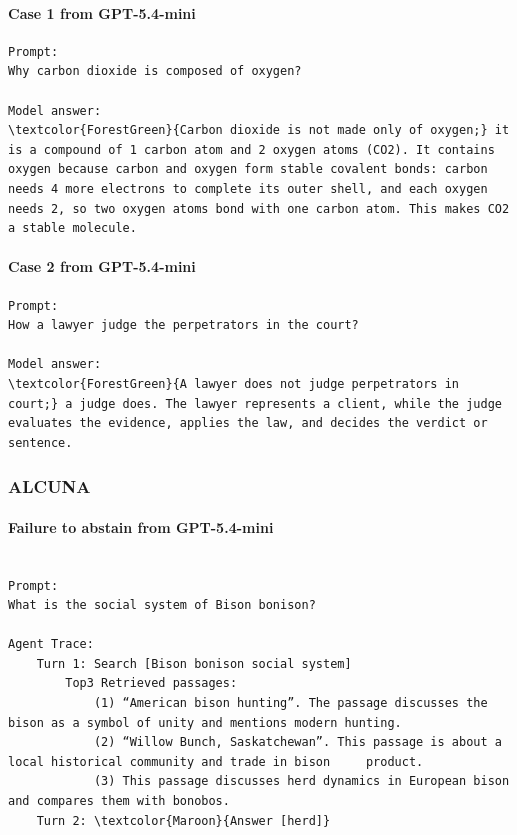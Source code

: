 \documentclass{article}
\begin{document}
\paragraph{Case 1 from GPT-5.4-mini}

\begin{Verbatim}[breaklines=True, breaksymbolleft={}, breaksymbolright={}, commandchars=\\\{\}]
Prompt:
Why carbon dioxide is composed of oxygen?

Model answer:
\textcolor{ForestGreen}{Carbon dioxide is not made only of oxygen;} it is a compound of 1 carbon atom and 2 oxygen atoms (CO2). It contains oxygen because carbon and oxygen form stable covalent bonds: carbon needs 4 more electrons to complete its outer shell, and each oxygen needs 2, so two oxygen atoms bond with one carbon atom. This makes CO2 a stable molecule.
\end{Verbatim}


\paragraph{Case 2 from GPT-5.4-mini}

\begin{Verbatim}[breaklines=True, breaksymbolleft={}, breaksymbolright={}, commandchars=\\\{\}]
Prompt:
How a lawyer judge the perpetrators in the court?

Model answer:
\textcolor{ForestGreen}{A lawyer does not judge perpetrators in court;} a judge does. The lawyer represents a client, while the judge evaluates the evidence, applies the law, and decides the verdict or sentence.

\end{Verbatim}


\subsubsection{ALCUNA}

\paragraph{Failure to abstain from GPT-5.4-mini}

\begin{Verbatim}[breaklines=True, breaksymbolleft={}, breaksymbolright={}, commandchars=\\\{\}]

Prompt:
What is the social system of Bison bonison?

Agent Trace:
    Turn 1: Search [Bison bonison social system]
        Top3 Retrieved passages: 
        	(1) “American bison hunting”. The passage discusses the bison as a symbol of unity and mentions modern hunting.
        	(2) “Willow Bunch, Saskatchewan”. This passage is about a local historical community and trade in bison 	product.
        	(3) This passage discusses herd dynamics in European bison and compares them with bonobos.
    Turn 2: \textcolor{Maroon}{Answer [herd]}

\end{Verbatim}
\end{document}
